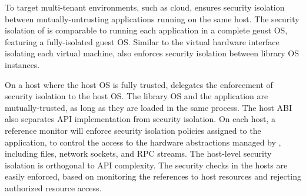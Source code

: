 






\label{sec:overview:host:security}


To target multi-tenant environments, such as cloud,
\graphene{} ensures security isolation between mutually-untrusting applications running on the same host.
The security isolation of \graphene{} is comparable to running each application
in a complete geust OS, featuring a fully-isolated guest OS.
Similar to the virtual hardware interface isolating each virtual machine,
\thehostabi{} also enforces security isolation between library OS instances.


On a host where the host OS is fully trusted,
\graphene{} delegates the enforcement of security isolation to the host OS.
The library OS and the application are mutually-trusted, as long as they are loaded in the same process.
The host ABI also separates API implementation
from security isolation.
On each host, a reference monitor will enforce security isolation policies assigned to the application, to control the access to the hardware abstractions managed by \thehostabi{}, including files, network sockets, and RPC streams.
The host-level security isolation is orthogonal to API complexity.
The security checks in the hosts are easily enforced,
based on monitoring the references to host resources and rejecting authorized resource access.





